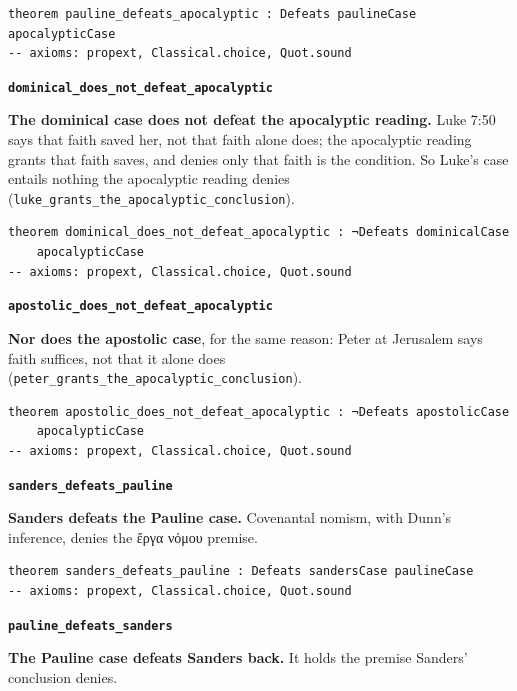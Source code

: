 \documentclass[11pt]{article}
\begin{document}
{\small\begin{verbatim}
theorem pauline_defeats_apocalyptic : Defeats paulineCase apocalypticCase
-- axioms: propext, Classical.choice, Quot.sound
\end{verbatim}}
\par\medskip\noindent\textbf{\texttt{dominical\_\allowbreak{}does\_\allowbreak{}not\_\allowbreak{}defeat\_\allowbreak{}apocalyptic}}\par\nobreak\noindent
\textbf{The dominical case does not defeat the apocalyptic reading.} Luke 7:50 says that faith saved her, not that faith alone does; the apocalyptic reading grants that faith saves, and denies only that faith is the condition. So Luke's case entails nothing the apocalyptic reading denies (\texttt{luke\_\allowbreak{}grants\_\allowbreak{}the\_\allowbreak{}apocalyptic\_\allowbreak{}conclusion}).

{\small\begin{verbatim}
theorem dominical_does_not_defeat_apocalyptic : ¬Defeats dominicalCase
    apocalypticCase
-- axioms: propext, Classical.choice, Quot.sound
\end{verbatim}}
\par\medskip\noindent\textbf{\texttt{apostolic\_\allowbreak{}does\_\allowbreak{}not\_\allowbreak{}defeat\_\allowbreak{}apocalyptic}}\par\nobreak\noindent
\textbf{Nor does the apostolic case}, for the same reason: Peter at Jerusalem says faith suffices, not that it alone does (\texttt{peter\_\allowbreak{}grants\_\allowbreak{}the\_\allowbreak{}apocalyptic\_\allowbreak{}conclusion}).

{\small\begin{verbatim}
theorem apostolic_does_not_defeat_apocalyptic : ¬Defeats apostolicCase
    apocalypticCase
-- axioms: propext, Classical.choice, Quot.sound
\end{verbatim}}
\par\medskip\noindent\textbf{\texttt{sanders\_\allowbreak{}defeats\_\allowbreak{}pauline}}\par\nobreak\noindent
\textbf{Sanders defeats the Pauline case.} Covenantal nomism, with Dunn's inference, denies the ἔργα νόμου premise.

{\small\begin{verbatim}
theorem sanders_defeats_pauline : Defeats sandersCase paulineCase
-- axioms: propext, Classical.choice, Quot.sound
\end{verbatim}}
\par\medskip\noindent\textbf{\texttt{pauline\_\allowbreak{}defeats\_\allowbreak{}sanders}}\par\nobreak\noindent
\textbf{The Pauline case defeats Sanders back.} It holds the premise Sanders' conclusion denies.
\end{document}
